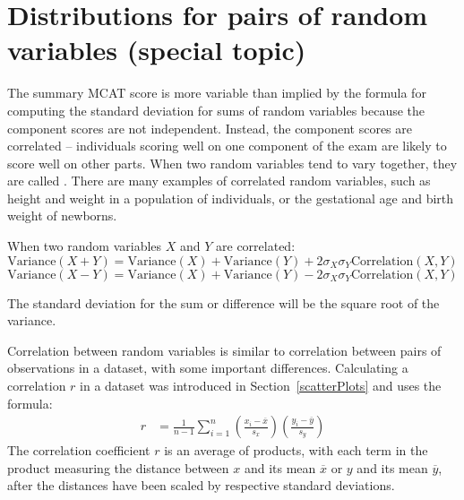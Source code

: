 \section{Distributions for pairs of random variables (special topic)}


The summary MCAT score is more variable than implied by the formula for computing the standard deviation for sums of random variables because the component scores are not independent. Instead, the component scores are correlated -- individuals scoring well on one component of the exam are likely to score well on other parts.  When two random variables tend to vary together, they are called .  There are many examples of correlated random variables, such as height and weight in a population of individuals, or the gestational age and birth weight of newborns.  

When two random variables $X$ and $Y$ are correlated:
\begin{equation} 
	\text{Variance}(X + Y) = \text{Variance}(X) + \text{Variance}(Y) + 
	2 \sigma_X \sigma_Y\text{Correlation}(X,Y) 
	\label{eq:generalVarianceSumRVs}
\end{equation}
\begin{equation}
	\text{Variance}(X - Y) = \text{Variance}(X) + \text{Variance}(Y) - 
	2 \sigma_X \sigma_Y\text{Correlation}(X,Y) 
	\label{eq:generalVarianceDiffRVs}
\end{equation}

The standard deviation for the sum or difference will be the square root of the variance.


Correlation between random variables is similar to correlation between pairs of observations in a dataset, with some important differences.  Calculating a correlation $r$ in a dataset was introduced in Section~\ref{scatterPlots} and uses the formula:
\begin{align}
      r &=  \frac{1}{n-1}\sum^{n}_{i=1}
      \left(\frac{x_{i}-\overline{x}}
      {s_{x}}\right)\left(\frac{y_{i}-\overline{y}}{s_{y}}\right)
\end{align} 
The correlation coefficient $r$ is an average of products, with each term in the product measuring the distance between $x$ and its mean $\overline{x}$ or $y$ and its mean $\overline{y}$, after the distances have been scaled by respective standard deviations.

